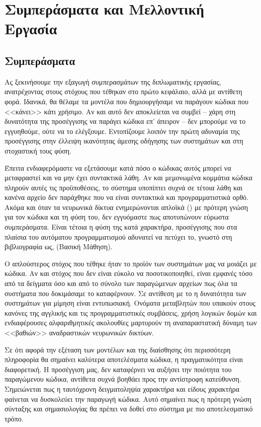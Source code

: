 \chapter{Συμπεράσματα και Μελλοντική Εργασία}

\section{Συμπεράσματα}

Ας ξεκινήσουμε την εξαγωγή συμπερασμάτων της διπλωματικής εργασίας, ανατρέχοντας στους στόχους που τέθηκαν στο πρώτο κεφάλαιο, αλλά με αντίθετη φορά.
Ιδανικά, θα θέλαμε τα μοντέλα που δημιουργήσαμε να παράγουν κώδικα που <<κάνει>> κάτι χρήσιμο. Αν και αυτό δεν αποκλείεται να συμβεί -- χάρη στη δυνατότητα της προσέγγισης να παράγει κώδικα  επ' άπειρον -- δεν μπορούμε να το εγγυηθούμε, ούτε να το ελέγξουμε.
Εντοπίζουμε λοιπόν την πρώτη αδυναμία της προσέγγισης στην έλλειψη ικανότητας άμεσης οδήγησης των συστημάτων και στη στοχαστική τους φύση.

Έπειτα ενδιαφερόμαστε να εξετάσουμε κατά πόσο ο κώδικας αυτός μπορεί να μεταφραστεί και να μην έχει συντακτικά λάθη.
Αν και μεμονωμένα κομμάτια κώδικα πληρούν αυτές τις προϋποθέσεις, το σύστημα υποπίπτει συχνά σε τέτοια λάθη και κανένα αρχείο δεν παράχθηκε που να είναι συντακτικά και προγραμματιστικά ορθό. 
Ακόμα και όταν τα νευρωνικά δίκτυα ενημερώνονται απλοϊκά () με πρότερη γνώση για τον κώδικα και τη φύση του, δεν εγγυόμαστε πως αποτυπώνουν εύρωστα συμπεράσματα.
Είναι τέτοια η φύση της κατά χαρακτήρα,  προσέγγισης που στα πλαίσια του αυτόματου προγραμματισμού αδυνατεί να πετύχει το, γνωστό στη βιβλιογραφία ως,  (Βασική Μάθηση).

Ο απλούστερος στόχος που τέθηκε ήταν το προϊόν των συστημάτων μας να μοιάζει με κώδικα. Αν και στόχος που δεν είναι εύκολο να ποσοτικοποιηθεί, είναι εμφανές τόσο από τα δείγματα όσο και από το σύνολο των παραγώμενων αρχείων πως όλα τα συστήματα που δοκιμάσαμε το καταφέρνουν. 
Σε αντίθεση με το  η δυνατότητα των συστημάτων για μίμηση είναι εντυπωσιακή.
Ονόματα μεταβλητών που υπακούν στους κανόνες της αγγλικής και τις προγραμματιστικές συμβάσεις, χρήση λογικών δομών και ενδιαφέρουσες αλφαριθμητικές ακολουθίες μαρτυρούν τη αναπαραστατική δύναμη των <<βαθιών>> αναδραστικών νευρωνικών δικτύων.

Σε ότι αφορά την εξέταση των  μοντέλων και της διαίσθησης ότι περισσότερη πληροφορία θα σημαίνει καλύτερα αποτελέσματα κώδικα, η πραγματικότητα είναι διαφορετική.
Η προσέγγιση μας, δεν καταφέρνει να αυξήσει την ποιότητα του παραγώμενου κώδικα, αντίθετα συχνά βοηθάει προς την αντίστροφη κατεύθυνση.
Σημειώνεται πως η ταυτόχρονη δειγματοληψία χαρακτήρα και είδους χαρακτήρα φαίνεται να δυσκολεύει την παραγωγή κώδικα.
Αυτό σημαίνει πως η πρότερη γνώση σύνταξης και σημασιολογίας  θα πρέπει να δοθεί στο σύστημα με πιο αποτελεσματικό τρόπο.

